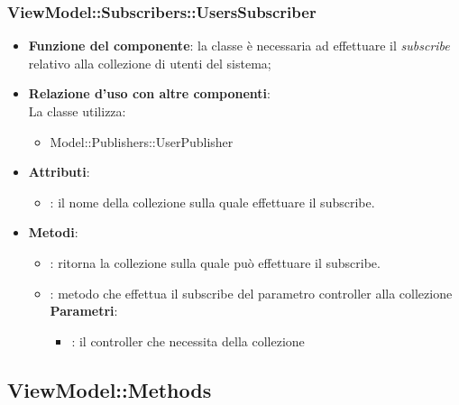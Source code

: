 \subsubsection{ViewModel::Subscribers::UsersSubscriber}
\begin{itemize}
\item\textbf{Funzione del componente}: la classe è necessaria ad effettuare il \emph{subscribe} relativo alla collezione di utenti del sistema;
	\item\textbf{Relazione d'uso con altre componenti}: \\
La classe utilizza:
	\begin{itemize}
		\item Model::Publishers::UserPublisher
	\end{itemize}
\item\textbf{Attributi}:
	\begin{itemize}
		\item{}: il nome della collezione sulla quale effettuare il subscribe.\\
	\end{itemize}
\item\textbf{Metodi}:
	\begin{itemize}
		\item{}: ritorna la collezione sulla quale può effettuare il subscribe.\\
		\item{}: metodo che effettua il subscribe del parametro controller alla collezione\\
		\textbf{Parametri}:
			\begin{itemize}
				\item{}: il controller che necessita della collezione\\
			\end{itemize}
	\end{itemize}
\end{itemize}

\subsection{ViewModel::Methods}
